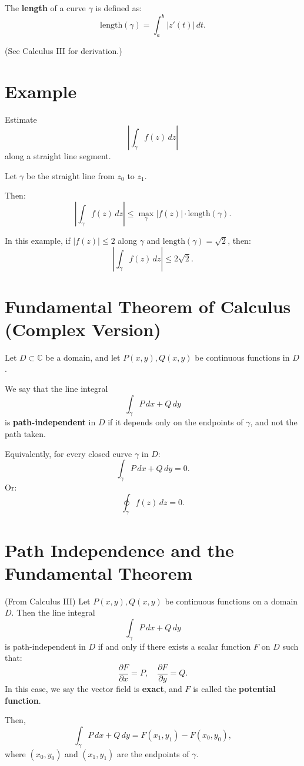 \documentclass[12pt]{article}
\theoremstyle{definition} %
\theoremstyle{plain} %
\begin{document}
The \textbf{length} of a curve $\gamma$ is defined as:
\[
\text{length}(\gamma) = \int_a^b |z'(t)|\,dt.
\]

(See Calculus III for derivation.)

\section*{Example}

Estimate
\[
\left| \int_{\gamma} f(z)\,dz \right|
\]
along a straight line segment.

Let $\gamma$ be the straight line from $z_0$ to $z_1$.

Then:
\[
\left| \int_{\gamma} f(z)\,dz \right| \leq \max_{\gamma} |f(z)| \cdot \text{length}(\gamma).
\]

In this example, if $|f(z)| \leq 2$ along $\gamma$ and $\text{length}(\gamma) = \sqrt{2}$, then:
\[
\left| \int_{\gamma} f(z)\,dz \right| \leq 2\sqrt{2}.
\]

\section*{Fundamental Theorem of Calculus (Complex Version)}

Let $D \subset \mathbb{C}$ be a domain, and let $P(x,y), Q(x,y)$ be continuous functions in $D$.

We say that the line integral
\[
\int_{\gamma} P\,dx + Q\,dy
\]
is \textbf{path-independent} in $D$ if it depends only on the endpoints of $\gamma$, and not the path taken.

Equivalently, for every closed curve $\gamma$ in $D$:
\[
\int_{\gamma} P\,dx + Q\,dy = 0.
\]
Or:
\[
\oint_{\gamma} f(z)\,dz = 0.
\]

\section*{Path Independence and the Fundamental Theorem}

(From Calculus III) Let $P(x,y), Q(x,y)$ be continuous functions on a domain $D$. Then the line integral
\[
\int_{\gamma} P\,dx + Q\,dy
\]
is path-independent in $D$ if and only if there exists a scalar function $F$ on $D$ such that:
\[
\frac{\partial F}{\partial x} = P, \quad \frac{\partial F}{\partial y} = Q.
\]
In this case, we say the vector field is \textbf{exact}, and $F$ is called the \textbf{potential function}.

Then,
\[
\int_{\gamma} P\,dx + Q\,dy = F(x_1, y_1) - F(x_0, y_0),
\]
where $(x_0, y_0)$ and $(x_1, y_1)$ are the endpoints of $\gamma$.
\end{document}

